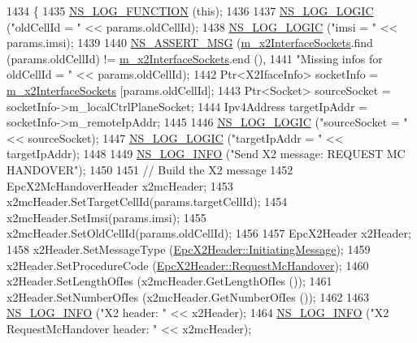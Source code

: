 \begin{DoxyCode}
1434 \{
1435   \hyperlink{log-macros-disabled_8h_a90b90d5bad1f39cb1b64923ea94c0761}{NS\_LOG\_FUNCTION} (\textcolor{keyword}{this});
1436 
1437   \hyperlink{group__logging_ga88acd260151caf2db9c0fc84997f45ce}{NS\_LOG\_LOGIC} (\textcolor{stringliteral}{"oldCellId = "} << params.oldCellId);
1438   \hyperlink{group__logging_ga88acd260151caf2db9c0fc84997f45ce}{NS\_LOG\_LOGIC} (\textcolor{stringliteral}{"imsi = "} << params.imsi);
1439 
1440   \hyperlink{assert_8h_aff5ece9066c74e681e74999856f08539}{NS\_ASSERT\_MSG} (\hyperlink{classns3_1_1EpcX2_a0665276228b9b99a52ef6d5e9bdb306d}{m\_x2InterfaceSockets}.find (params.oldCellId) != 
      \hyperlink{classns3_1_1EpcX2_a0665276228b9b99a52ef6d5e9bdb306d}{m\_x2InterfaceSockets}.end (),
1441                  \textcolor{stringliteral}{"Missing infos for oldCellId = "} << params.oldCellId);
1442   Ptr<X2IfaceInfo> socketInfo = \hyperlink{classns3_1_1EpcX2_a0665276228b9b99a52ef6d5e9bdb306d}{m\_x2InterfaceSockets} [params.oldCellId];
1443   Ptr<Socket> sourceSocket = socketInfo->m\_localCtrlPlaneSocket;
1444   Ipv4Address targetIpAddr = socketInfo->m\_remoteIpAddr;
1445 
1446   \hyperlink{group__logging_ga88acd260151caf2db9c0fc84997f45ce}{NS\_LOG\_LOGIC} (\textcolor{stringliteral}{"sourceSocket = "} << sourceSocket);
1447   \hyperlink{group__logging_ga88acd260151caf2db9c0fc84997f45ce}{NS\_LOG\_LOGIC} (\textcolor{stringliteral}{"targetIpAddr = "} << targetIpAddr);
1448 
1449   \hyperlink{group__logging_gafbd73ee2cf9f26b319f49086d8e860fb}{NS\_LOG\_INFO} (\textcolor{stringliteral}{"Send X2 message: REQUEST MC HANDOVER"});
1450 
1451   \textcolor{comment}{// Build the X2 message}
1452   EpcX2McHandoverHeader x2mcHeader;
1453   x2mcHeader.SetTargetCellId(params.targetCellId);
1454   x2mcHeader.SetImsi(params.imsi);
1455   x2mcHeader.SetOldCellId(params.oldCellId);
1456 
1457   EpcX2Header x2Header;
1458   x2Header.SetMessageType (\hyperlink{classns3_1_1EpcX2Header_a0e69b043a20eaee4c570f223f4eca715a5761e50c3c1918a44e3a5ebc86f17435}{EpcX2Header::InitiatingMessage});
1459   x2Header.SetProcedureCode (\hyperlink{classns3_1_1EpcX2Header_afd178c1ed3c47948c587955698a15b0da10ebb8c46efe10d8f9bacbd89027d945}{EpcX2Header::RequestMcHandover});
1460   x2Header.SetLengthOfIes (x2mcHeader.GetLengthOfIes ());
1461   x2Header.SetNumberOfIes (x2mcHeader.GetNumberOfIes ());
1462 
1463   \hyperlink{group__logging_gafbd73ee2cf9f26b319f49086d8e860fb}{NS\_LOG\_INFO} (\textcolor{stringliteral}{"X2 header: "} << x2Header);
1464   \hyperlink{group__logging_gafbd73ee2cf9f26b319f49086d8e860fb}{NS\_LOG\_INFO} (\textcolor{stringliteral}{"X2 RequestMcHandover header: "} << x2mcHeader);

\end{DoxyCode}
